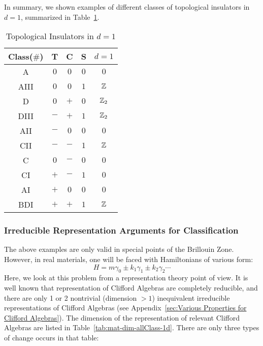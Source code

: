 In summary, we shown examples of different classes of topological insulators in
$d=1$, summarized in Table~\ref{tab:ti-d=1}.
\begin{table}[htpb]
    \centering
    \caption{Topological Insulators in $d=1$}
    \label{tab:ti-d=1}
    \begin{tabular}{c | c c c | c }
        Class($\#$) & T & C & S & $d=1$ \\
        \hline 
        A & $0$ & $0$ & $0$ & $0$ \\
        AIII & $0$ & $0$ & $1$ & $\mathbb{Z}$ \\
        \hline
        D & $0$ & $+$ & $0$ & $\mathbb{Z}_2$ \\
        DIII & $-$ & $+$ & $1$ & $\mathbb{Z}_2$ \\
        AII & $-$ & $0$ & $0$ & $0$ \\
        CII & $-$ & $-$ & $1$ & $\mathbb{Z}$ \\
        C & $0$ & $-$ & $0$ & $0$ \\
        CI & $+$ & $-$ & $1$ & $0$ \\
        AI & $+$ & $0$ & $0$ & $0$ \\
        BDI & $+$ & $+$ & $1$ & $\mathbb{Z}$ \\
        \hline
    \end{tabular}
\end{table}
\subsubsection{Irreducible Representation Arguments for Classification}
\label{sec:Irreducible Representation Arguments for Classification}
The above examples are only valid in special points of the Brillouin Zone.
However, in real materials, one will be faced with Hamiltonians of various form:
\begin{equation}
    H = m\gamma_0 \pm k_1\gamma_1 \pm k_2\gamma_2 \cdots
\end{equation}
Here, we look at this problem from a representation theory point of view. It is
well known that representation of Clifford Algebras are completely reducible,
and there are only 1 or 2 nontrivial (dimension $>1$) inequivalent irreducible
representations of Clifford Algebras (see Appendix~\ref{sec:Various Properties for
Clifford Algebras}).  The dimension of the representation of relevant Clifford
Algebras are listed in Table~\ref{tab:mat-dim-allClass-1d}. There are only three
types of change occurs in that table:

